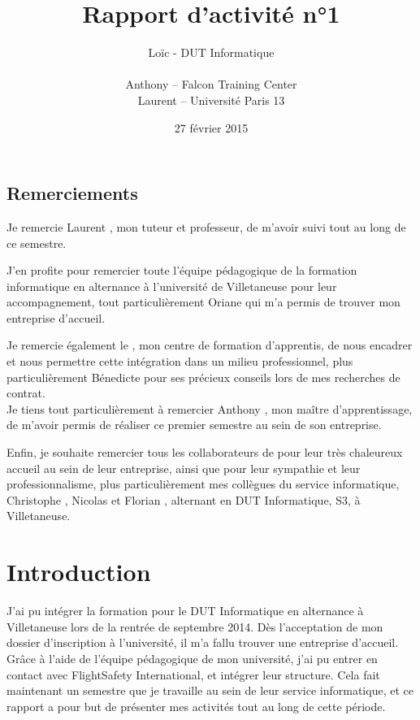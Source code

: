 \documentclass[a4paper,french,11pt,openany,oneside]{memoir}
\title{Rapport d'activité n°1}
\author{Loïc \bsc{Payol} - DUT Informatique \\ \\
Anthony \bsc{Cor} -- Falcon Training Center \\ Laurent \bsc{Audibert} -- Université Paris 13}
\date{27 février 2015}
\begin{document}

\thispagestyle{plain}
\maketitle
\begin{KeepFromToc}

\tableofcontents
\newpage

\chapter*{Remerciements}
\thispagestyle{plain}

Je remercie Laurent , mon tuteur et professeur, de m'avoir suivi tout au long de ce semestre.

J'en profite pour remercier toute l'équipe pédagogique de la formation informatique en alternance à l'université de Villetaneuse pour leur accompagnement, tout particulièrement Oriane  qui m'a permis de trouver mon entreprise d'accueil.

Je remercie également le , mon centre de formation d'apprentis, de nous encadrer et nous permettre cette intégration dans un milieu professionnel, plus particulièrement Bénedicte  pour ses précieux conseils lors de mes recherches de contrat.
\\

Je tiens tout particulièrement à remercier Anthony , mon maître d'apprentissage, de m'avoir permis de réaliser ce premier semestre au sein de son entreprise.

Enfin, je souhaite remercier tous les collaborateurs de  pour leur très chaleureux accueil au sein de leur entreprise, ainsi que pour leur sympathie et leur professionnalisme, plus particulièrement mes collègues du service informatique, Christophe , Nicolas  et Florian , alternant en DUT Informatique, S3, à Villetaneuse.

\end{KeepFromToc}

\chapter*{Introduction}

J'ai pu intégrer la formation pour le DUT Informatique en alternance à Villetaneuse lors de la rentrée de septembre 2014. Dès l'acceptation de mon dossier d'inscription à l'université, il m'a fallu trouver une entreprise d'accueil. Grâce à l'aide de l'équipe pédagogique de mon université, j'ai pu entrer en contact avec FlightSafety International, et intégrer leur structure. Cela fait maintenant un semestre que je travaille au sein de leur service informatique, et ce rapport a pour but de présenter mes activités tout au long de cette période.
\end{document}
